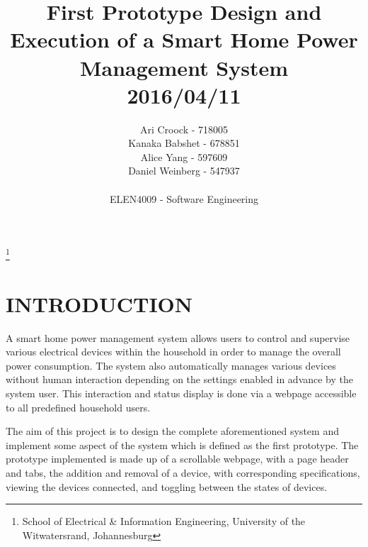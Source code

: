 \documentclass[10pt,twocolumn]{witseiepaper}
\begin{document}
	
	
	\title{First Prototype Design and Execution of a Smart Home Power Management System\\ 2016/04/11}
	
	\author{Ari Croock - 718005\\Kanaka Babshet - 678851\\Alice Yang - 597609\\Daniel Weinberg - 547937\\\\ELEN4009 - Software Engineering}
	\thanks{School of Electrical \& Information Engineering, University of the
		Witwatersrand, Johannesburg}
	
	
	\maketitle
	\thispagestyle{empty}\pagestyle{empty}
	
	
	\section{INTRODUCTION}
	
	A smart home power management system allows users to control and supervise various electrical devices within the household in order to manage the overall power consumption. The system also automatically manages various devices without human interaction depending on the settings enabled in advance by the system user.
	This interaction and status display is done via a webpage accessible to all predefined household users. 
	
	The aim of this project is to design the complete aforementioned system and implement some aspect of the system which is defined as the first prototype. The prototype implemented is made up of a scrollable webpage, with a page header and tabs, the addition and removal of a device, with corresponding specifications, viewing the devices connected, and toggling between the states of devices. 
	
\end{document}
